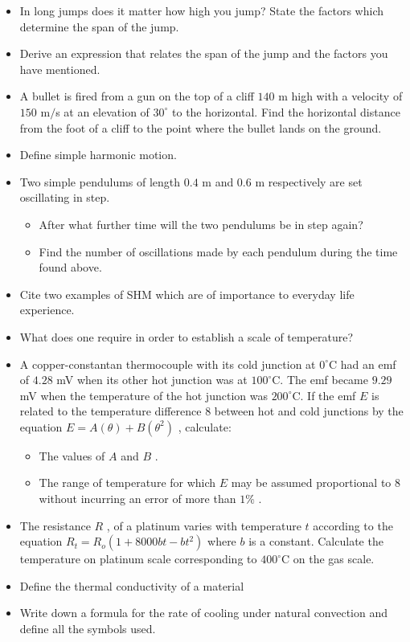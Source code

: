 \documentclass{article}
\begin{document}
\begin{itemize}
\item In long jumps does it matter how high you jump? State the factors which determine the span of the jump. 
\item Derive an expression that relates the span of the jump and the factors you have mentioned.
\item A bullet is fired from a gun on the top of a cliff $ 140$ m high with a velocity of $ 150$ m$/$s at an elevation of $ 30^{\circ}$ to the horizontal. Find the horizontal distance from the foot of a cliff to the point where the bullet lands on the ground.
\item Define simple harmonic motion.
\item Two simple pendulums of length $ 0.4$ m and $ 0.6$ m respectively are set oscillating in step. 
 \begin{itemize}
\item After what further time will the two pendulums be in step again? 
\item Find the number of oscillations made by each pendulum during the time found above.
\end{itemize}
\item Cite two examples of SHM which are of importance to everyday life experience.
\item What does one require in order to establish a scale of temperature?
\item A copper-constantan thermocouple with its cold junction at $ 0^{\circ}$C had an emf of $ 4.28$ mV when its other hot junction was at $ 100^{\circ}$C. The emf became $ 9.29$ mV when the temperature of the hot junction was $ 200^{\circ}$C. If the emf $ E$ is related to the temperature difference $ 8$ between hot and cold junctions by the equation $ E= A(\theta )+B(\theta ^{2})$ , calculate:
 \begin{itemize}
\item The values of $ A$ and $ B$ .
\item The range of temperature for which $ E$ may be assumed proportional to $ 8$ without incurring an error of more than $ 1\%$ .
\end{itemize}
\item The resistance $ R$ , of a platinum varies with temperature $ t$ according to the equation $ R_{t}=R_{o}(1+8000bt -b t^{2})$ where $ b$ is a constant. Calculate the temperature on platinum scale corresponding to $ 400^{\circ}$C on the gas scale. 
\item Define the thermal conductivity of a material
\item Write down a formula for the rate of cooling under natural convection and define all the symbols used. 

\end{itemize}
\end{document}
